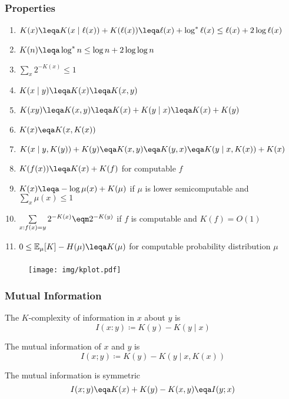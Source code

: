 \documentclass[UTF8,11pt,colorlinks,compress,openany]{beamer}%
\begin{document}
\begin{frame}\frametitle{Properties}
	\begin{enumerate}
		\item $K(x)\leqa K(x\mid \ell(x))+K(\ell(x))\leqa\ell(x)+\log^* \ell(x) \leq \ell(x)+2\log \ell(x)$
		\item $K(n)\leqa \log^* n\leq \log n+2\log\log n$
		\item $\sum_x 2^{-K(x)}\leq 1$
		\item $K(x\mid y)\leqa K(x)\leqa K(x,y)$
		\item $K(xy)\leqa K(x,y)\leqa K(x)+K(y\mid x)\leqa K(x)+K(y)$
		\item $K(x)\eqa K(x,K(x))$
		\item $K(x\mid y,K(y))+K(y)\eqa K(x,y)\eqa K(y,x)\eqa K(y\mid x,K(x))+K(x)$
		\item $K(f(x))\leqa K(x)+K(f)$ for computable $f$
		\item $K(x)\leqa-\log \mu(x)+K(\mu)$ if $\mu$ is lower semicomputable and $\sum_x \mu(x)\leq 1$
		\item $\sum\limits_{x:f(x)=y} 2^{-K(x)}\eqm 2^{-K(y)}$ if $f$ is computable and $K(f)=O(1)$
		\item $0\leq \mathbb{E}_\mu [K] - H(\mu) \leqa K(\mu)$ for computable probability distribution $\mu$
	\end{enumerate}
\end{frame}

\begin{frame}\frametitle{}
\begin{figure}[H]
\texttt{[image: img/kplot.pdf]}
\end{figure}
\end{frame}

\begin{frame}\frametitle{Mutual Information}
The $K$-complexity of information in $x$ about $y$ is
\[I(x:y)\coloneqq K(y)-K(y\mid x)\]
\begin{definition}
The mutual information of $x$ and $y$ is
\[I(x;y)\coloneqq K(y)-K(y\mid x,K(x))\]
\end{definition}
\begin{theorem}
The mutual information is symmetric
\[I(x;y)\eqa K(x)+K(y)-K(x,y)\eqa I(y;x)\]
\end{theorem}
\end{frame}
\end{document}
